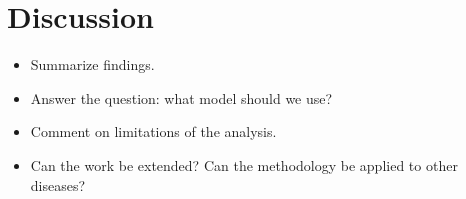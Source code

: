 \documentclass[12pt,a4paper]{article}
\begin{document}
\section{Discussion}
\label{sec:discussion}
\begin{itemize}
\item Summarize findings. 
\item Answer the question: what model should we use?
\item Comment on limitations of the analysis.
\item Can the work be extended? Can the methodology be applied to other diseases?
\end{itemize}



\end{document}

